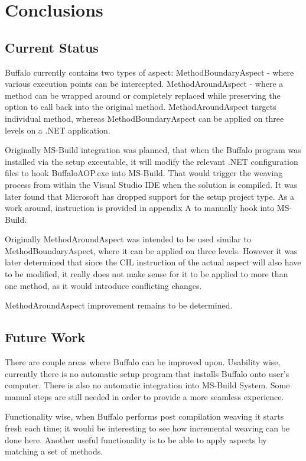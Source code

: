\chapter{Conclusions}
\section{Current Status}

Buffalo currently contains two types of aspect:  MethodBoundaryAspect - where various execution points can be intercepted. MethodAroundAspect - where a method can be wrapped around or completely replaced while preserving the option to call back into the original method. MethodAroundAspect targets individual method, whereas MethodBoundaryAspect can be applied on three levels on a .NET application.

Originally MS-Build integration was planned, that when the Buffalo program was installed via the setup executable, it will modify the relevant .NET configuration files to hook BuffaloAOP.exe into MS-Build. That would trigger the weaving process from within the Visual Studio IDE when the solution is compiled. It was later found that Microsoft has dropped support for the setup project type. As a work around, instruction is provided in appendix A to manually hook into MS-Build.

Originally MethodAroundAspect was intended to be used similar to MethodBoundaryAspect, where it can be applied on three levels. However it was later determined that since the CIL instruction of the actual aspect will also have to be modified, it really does not make sense for it to be applied to more than one method, as it would introduce conflicting changes.

MethodAroundAspect improvement remains to be determined.

\section{Future Work}

There are couple areas where Buffalo can be improved upon. Usability wise, currently there is no automatic setup program that installs Buffalo onto user’s computer. There is also no automatic integration into MS-Build System. Some manual steps are still needed in order to provide a more seamless experience.

Functionality wise, when Buffalo performs post compilation weaving it starts fresh each time; it would be interesting to see how incremental weaving can be done here. Another useful functionality is to be able to apply aspects by matching a set of methods.

